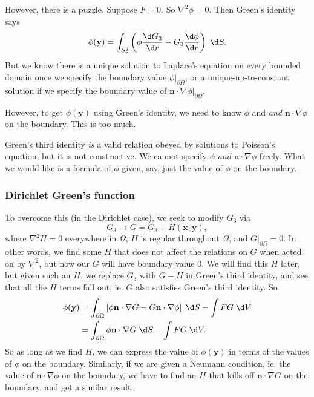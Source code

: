 \documentclass[a4paper]{article}
\begin{document}
However, there is a puzzle. Suppose $F = 0$. So $\nabla^2 \phi = 0$. Then Green's identity says
\[
  \phi(\mathbf{y}) = \int_{S_r^2} \left(\phi \frac{\d G_3}{\d r} - G_3 \frac{\d \phi}{\d r}\right)\;\d S.
\]
But we know there is a unique solution to Laplace's equation on every bounded domain once we specify the boundary value $\phi|_{\partial \Omega}$, or a unique-up-to-constant solution if we specify the boundary value of $\mathbf{n}\cdot \nabla \phi|_{\partial \Omega}$.

However, to get $\phi(\mathbf{y})$ using Green's identity, we need to know $\phi$ and \emph{and} $\mathbf{n} \cdot \nabla \phi$ on the boundary. This is too much.

Green's third identity \emph{is} a valid relation obeyed by solutions to Poisson's equation, but it is not constructive. We cannot specify $\phi$ \emph{and} $\mathbf{n}\cdot \nabla \phi$ freely. What we would like is a formula of $\phi$ given, say, just the value of $\phi$ on the boundary.

\subsubsection*{Dirichlet Green's function}
To overcome this (in the Dirichlet case), we seek to modify $G_3$ via
\[
  G_3 \to G = G_3 + H(\mathbf{x}, \mathbf{y}),
\]
where $\nabla^2 H = 0$ everywhere in $\Omega$, $H$ is regular throughout $\Omega$, and $G|_{\partial \Omega} = 0$. In other words, we find some $H$ that does not affect the relations on $G$ when acted on by $\nabla^2$, but now our $G$ will have boundary value $0$. We will find this $H$ later, but given such an $H$, we replace $G_3$ with $G - H$ in Green's third identity, and see that all the $H$ terms fall out, ie. $G$ also satisfies Green's third identity. So
\begin{align*}
  \phi(\mathbf{y}) &= \int_{\partial\Omega} \left[\phi \mathbf{n}\cdot \nabla G - G \mathbf{n}\cdot \nabla \phi\right]\;\d S - \int FG\;\d V\\
  &= \int_{\partial\Omega} \phi \mathbf{n}\cdot \nabla G\;\d S - \int FG\;\d V.
\end{align*}
So as long as we find $H$, we can express the value of $\phi(\mathbf{y})$ in terms of the values of $\phi$ on the boundary. Similarly, if we are given a Neumann condition, ie. the value of $\mathbf{n} \cdot \nabla \phi$ on the boundary, we have to find an $H$ that kills off $\mathbf{n}\cdot \nabla G$ on the boundary, and get a similar result.
\end{document}
